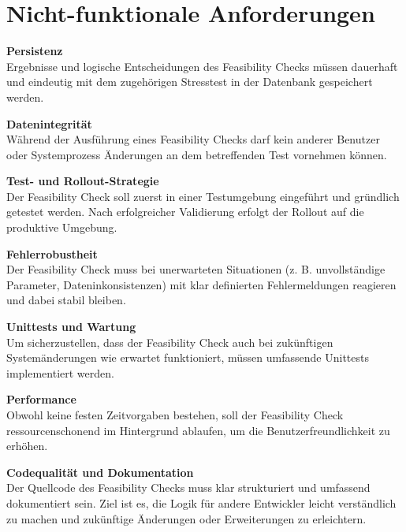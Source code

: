 \section{Nicht-funktionale Anforderungen}

\setlength{\leftskip}{1em} 
\textbf{Persistenz}  \\
Ergebnisse und logische Entscheidungen des Feasibility Checks müssen dauerhaft und eindeutig mit dem zugehörigen Stresstest in der Datenbank gespeichert werden.

\textbf{Datenintegrität}  \\
Während der Ausführung eines Feasibility Checks darf kein anderer Benutzer oder Systemprozess Änderungen an dem betreffenden Test vornehmen können.

\textbf{Test- und Rollout-Strategie}  \\
Der Feasibility Check soll zuerst in einer Testumgebung eingeführt und gründlich getestet werden. Nach erfolgreicher Validierung erfolgt der Rollout auf die produktive Umgebung.

\textbf{Fehlerrobustheit}  \\
Der Feasibility Check muss bei unerwarteten Situationen (z. B. unvollständige Parameter, Dateninkonsistenzen) mit klar definierten Fehlermeldungen reagieren und dabei stabil bleiben.

\textbf{Unittests und Wartung}  \\
Um sicherzustellen, dass der Feasibility Check auch bei zukünftigen Systemänderungen wie erwartet funktioniert, müssen umfassende Unittests implementiert werden.

\textbf{Performance}  \\
Obwohl keine festen Zeitvorgaben bestehen, soll der Feasibility Check ressourcenschonend im Hintergrund ablaufen, um die Benutzerfreundlichkeit zu erhöhen.

\textbf{Codequalität und Dokumentation}  \\
Der Quellcode des Feasibility Checks muss klar strukturiert und umfassend dokumentiert sein. Ziel ist es, die Logik für andere Entwickler leicht verständlich zu machen und zukünftige Änderungen oder Erweiterungen zu erleichtern.


\setlength{\leftskip}{0em} %